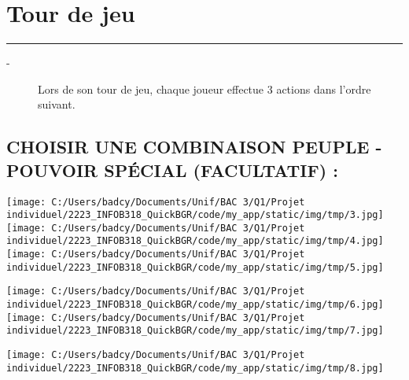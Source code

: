 \documentclass{scrartcl}%
\begin{document}
%
\sectionfont{\color{mygreen}}%
\subsectionfont{\color{mygreen}}%
\subsubsectionfont{\color{mygreen}}%
\section{ Tour de jeu
}%
\label{sec:Tourdejeu}%
\textcolor{mygreen}{\rule{18cm}{0.07cm}}\break%
\begin{description}%
\item[{-} ]%
%
 Lors de son tour de jeu, chaque joueur effectue 3 actions dans l'ordre suivant.
%
\end{description}

%
\subsection{ CHOISIR UNE COMBINAISON PEUPLE {-} POUVOIR SPÉCIAL (FACULTATIF) :
}%
\label{subsec:CHOISIRUNECOMBINAISONPEUPLE{-}POUVOIRSPCIAL(FACULTATIF)}%
%
\texttt{[image: C:/Users/badcy/Documents/Unif/BAC 3/Q1/Projet individuel/2223\_INFOB318\_QuickBGR/code/my\_app/static/img/tmp/3.jpg]}%
%
\texttt{[image: C:/Users/badcy/Documents/Unif/BAC 3/Q1/Projet individuel/2223\_INFOB318\_QuickBGR/code/my\_app/static/img/tmp/4.jpg]}%
%
\texttt{[image: C:/Users/badcy/Documents/Unif/BAC 3/Q1/Projet individuel/2223\_INFOB318\_QuickBGR/code/my\_app/static/img/tmp/5.jpg]}%

%
%
\texttt{[image: C:/Users/badcy/Documents/Unif/BAC 3/Q1/Projet individuel/2223\_INFOB318\_QuickBGR/code/my\_app/static/img/tmp/6.jpg]}%
%
\texttt{[image: C:/Users/badcy/Documents/Unif/BAC 3/Q1/Projet individuel/2223\_INFOB318\_QuickBGR/code/my\_app/static/img/tmp/7.jpg]}%

%
%
\texttt{[image: C:/Users/badcy/Documents/Unif/BAC 3/Q1/Projet individuel/2223\_INFOB318\_QuickBGR/code/my\_app/static/img/tmp/8.jpg]}%

%
\end{document}
